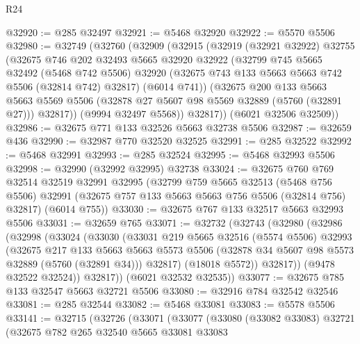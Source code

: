 \begin{lexlean}{R24}
\begin{coremodule}
@32920 := @285 @32497
@32921 := @5468 @32920
@32922 := @5570 @5506
@32980 := @32749
    (@32760
      (@32909
        (@32915
          (@32919
            (@32921 @32922)
            @32755
            (@32675
              @746
              @202
              @32493
              @5665
              @32920
              @32922
              (@32799
                @745
                @5665
                @32492
                (@5468 @742 @5506)
                @32920
                (@32675 @743 @133 @5663 @5663 @742 @5506 (@32814 @742) @32817)
                (@6014 @741))
              (@32675
                @200
                @133
                @5663
                @5663
                @5569
                @5506
                (@32878 @27 @5607 @98 @5569 @32889 (@5760 (@32891 @27)))
                @32817))
            (@9994 @32497 @5568))
          @32817))
      (@6021 @32506 @32509))
@32986 := @32675 @771 @133 @32526 @5663 @32738 @5506
@32987 := @32659 @436
@32990 := @32987 @770 @32520 @32525
@32991 := @285 @32522
@32992 := @5468 @32991
@32993 := @285 @32524
@32995 := @5468 @32993 @5506
@32998 := @32990 (@32992 @32995) @32738
@33024 := @32675
    @760
    @769
    @32514
    @32519
    @32991
    @32995
    (@32799
      @759
      @5665
      @32513
      (@5468 @756 @5506)
      @32991
      (@32675 @757 @133 @5663 @5663 @756 @5506 (@32814 @756) @32817)
      (@6014 @755))
@33030 := @32675 @767 @133 @32517 @5663 @32993 @5506
@33031 := @32659 @765
@33071 := @32732
    (@32743
      (@32980
        (@32986
          (@32998
            (@33024
              (@33030
                (@33031
                  @219
                  @5665
                  @32516
                  (@5574 @5506)
                  @32993
                  (@32675
                    @217
                    @133
                    @5663
                    @5663
                    @5573
                    @5506
                    (@32878 @34 @5607 @98 @5573 @32889 (@5760 (@32891 @34)))
                    @32817)
                  (@18018 @5572))
                @32817))
            (@9478 @32522 @32524))
          @32817))
      (@6021 @32532 @32535))
@33077 := @32675 @785 @133 @32547 @5663 @32721 @5506
@33080 := @32916 @784 @32542 @32546
@33081 := @285 @32544
@33082 := @5468 @33081
@33083 := @5578 @5506
@33141 := @32715
    (@32726
      (@33071
        (@33077
          (@33080
            (@33082 @33083)
            @32721
            (@32675
              @782
              @265
              @32540
              @5665
              @33081
              @33083

\end{coremodule}
\end{lexlean}
